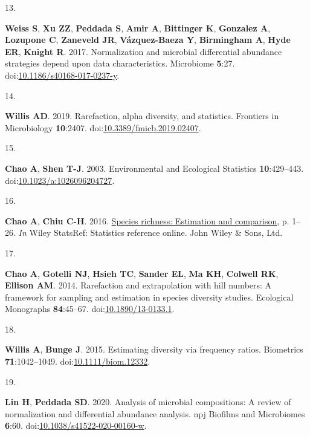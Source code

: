 \documentclass[
]{article}
\newlength{\cslhangindent}
\newlength{\csllabelwidth}
\newlength{\cslentryspacingunit} %
\newenvironment{CSLReferences}[2] %
 {%
  \setlength{\parindent}{0pt}
  \ifodd #1
  \let\oldpar\par
  \def\par{\hangindent=\cslhangindent\oldpar}
  \fi
  \setlength{\parskip}{#2\cslentryspacingunit}
 }%
 {}
\newcommand{\CSLLeftMargin}[1]{\parbox[t]{\csllabelwidth}{#1}}
\newcommand{\CSLRightInline}[1]{\parbox[t]{\linewidth - \csllabelwidth}{#1}\break}
\begin{document}
\begin{CSLReferences}{0}{1}
\leavevmode{}%
\CSLLeftMargin{13. }%
\CSLRightInline{\textbf{Weiss S}, \textbf{Xu ZZ}, \textbf{Peddada S},
\textbf{Amir A}, \textbf{Bittinger K}, \textbf{Gonzalez A},
\textbf{Lozupone C}, \textbf{Zaneveld JR}, \textbf{Vázquez-Baeza Y},
\textbf{Birmingham A}, \textbf{Hyde ER}, \textbf{Knight R}. 2017.
Normalization and microbial differential abundance strategies depend
upon data characteristics. Microbiome \textbf{5}:27.
doi:\href{https://doi.org/10.1186/s40168-017-0237-y}{10.1186/s40168-017-0237-y}.}

\leavevmode{}%
\CSLLeftMargin{14. }%
\CSLRightInline{\textbf{Willis AD}. 2019. Rarefaction, alpha diversity,
and statistics. Frontiers in Microbiology \textbf{10}:2407.
doi:\href{https://doi.org/10.3389/fmicb.2019.02407}{10.3389/fmicb.2019.02407}.}

\leavevmode{}%
\CSLLeftMargin{15. }%
\CSLRightInline{\textbf{Chao A}, \textbf{Shen T-J}. 2003. Environmental
and Ecological Statistics \textbf{10}:429--443.
doi:\href{https://doi.org/10.1023/a:1026096204727}{10.1023/a:1026096204727}.}

\leavevmode{}%
\CSLLeftMargin{16. }%
\CSLRightInline{\textbf{Chao A}, \textbf{Chiu C-H}. 2016.
\href{https://doi.org/10.1002/9781118445112.stat03432.pub2}{Species
richness: Estimation and comparison}, p. 1--26. \emph{In} Wiley
StatsRef: Statistics reference online. John Wiley \& Sons, Ltd.}

\leavevmode{}%
\CSLLeftMargin{17. }%
\CSLRightInline{\textbf{Chao A}, \textbf{Gotelli NJ}, \textbf{Hsieh TC},
\textbf{Sander EL}, \textbf{Ma KH}, \textbf{Colwell RK}, \textbf{Ellison
AM}. 2014. Rarefaction and extrapolation with hill numbers: A framework
for sampling and estimation in species diversity studies. Ecological
Monographs \textbf{84}:45--67.
doi:\href{https://doi.org/10.1890/13-0133.1}{10.1890/13-0133.1}.}

\leavevmode{}%
\CSLLeftMargin{18. }%
\CSLRightInline{\textbf{Willis A}, \textbf{Bunge J}. 2015. Estimating
diversity via frequency ratios. Biometrics \textbf{71}:1042--1049.
doi:\href{https://doi.org/10.1111/biom.12332}{10.1111/biom.12332}.}

\leavevmode{}%
\CSLLeftMargin{19. }%
\CSLRightInline{\textbf{Lin H}, \textbf{Peddada SD}. 2020. Analysis of
microbial compositions: A review of normalization and differential
abundance analysis. npj Biofilms and Microbiomes \textbf{6}:60.
doi:\href{https://doi.org/10.1038/s41522-020-00160-w}{10.1038/s41522-020-00160-w}.}


\end{CSLReferences}
\end{document}
